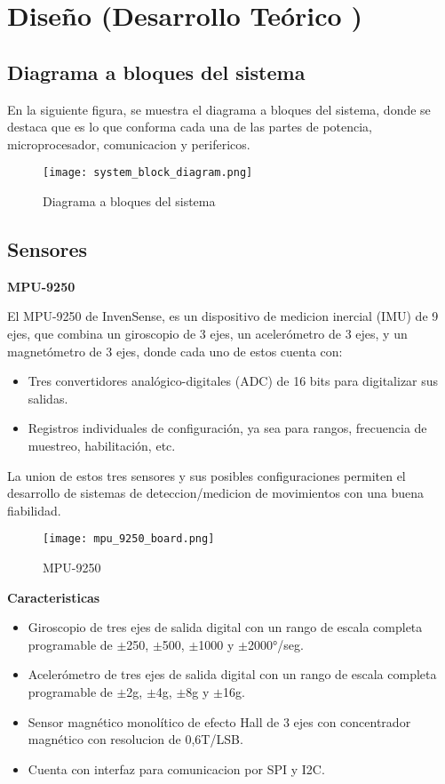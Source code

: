 \section{Diseño (Desarrollo Teórico )}
\subsection{Diagrama a bloques del sistema}
En la siguiente figura, se muestra el diagrama a bloques del sistema, donde se destaca que es lo que
conforma cada una de las partes de potencia, microprocesador, comunicacion y perifericos.
    \begin{figure}[htp]
        \centering
            \texttt{[image: system\_block\_diagram.png]}
            \caption{Diagrama a bloques del sistema}
    \end{figure}
\subsection{Sensores}    
\textbf{MPU-9250}
    
    El MPU-9250 de InvenSense, es un dispositivo de medicion inercial (IMU) de 9 ejes, que combina un giroscopio de 3 ejes,
    un acelerómetro de 3 ejes, y un magnetómetro de 3 ejes, donde cada uno de estos cuenta con:
        \begin{itemize}
            \item Tres convertidores analógico-digitales (ADC) de 16 bits para digitalizar sus salidas. 
            \item Registros individuales de configuración, ya sea para rangos, frecuencia de muestreo, habilitación, etc.
        \end{itemize}

    La union de estos tres sensores y sus posibles configuraciones permiten el desarrollo de sistemas de deteccion/medicion de 
    movimientos con una buena fiabilidad. 

        \begin{figure}[htp]
            \centering
                \texttt{[image: mpu\_9250\_board.png]}
                \caption{MPU-9250 }
        \end{figure}

    \textbf{Caracteristicas}
        
    \begin{itemize}
        \item Giroscopio de tres ejes de salida digital con un rango de escala completa programable de $ \pm $250, $ \pm $500, $ \pm $1000 y $ \pm $2000°/seg.
        \item Acelerómetro de tres ejes de salida digital con un rango de escala completa programable de $ \pm $2g, $ \pm $4g, $ \pm $8g y $ \pm $16g.
        \item Sensor magnético monolítico de efecto Hall de 3 ejes con concentrador magnético con resolucion de 0,6T/LSB.
        \item Cuenta con interfaz para comunicacion por SPI y I2C.
    \end{itemize}
